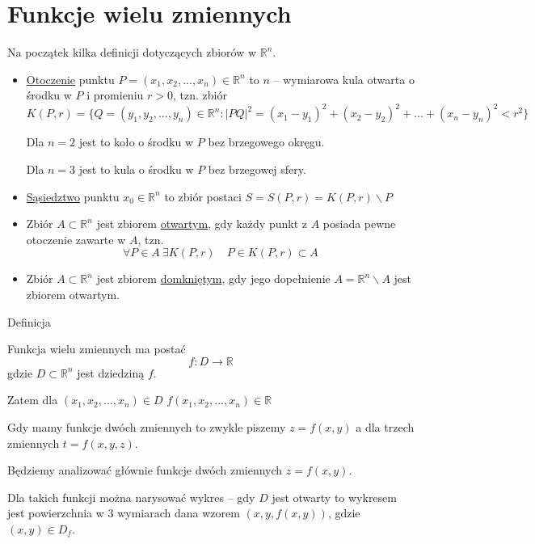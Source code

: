 \section{Funkcje wielu zmiennych}

Na początek kilka definicji dotyczących zbiorów w $ \mathbb{R}^n $.

\begin{itemize}
    \item \underline{Otoczenie} punktu $ P = (x_1, x_2, ..., x_n) \in \mathbb{R}^n $ to $n$ -- wymiarowa kula otwarta o środku
    w $P$ i promieniu $r > 0$, tzn. zbiór
    \[ K(P, r) = \{ Q = (y_1, y_2, ..., y_n) \in \mathbb{R}^n : |PQ|^2 = (x_1 - y_1)^2 + (x_2 - y_2)^2 + ... + (x_n - y_n)^2 < r^2 \} \]

    Dla $n=2$ jest to koło o środku w $P$ bez brzegowego okręgu.

    Dla $n=3$ jest to kula o środku w $P$ bez brzegowej sfery.
    \item \underline{Sąsiedztwo} punktu $x_0 \in \mathbb{R}^n$ to zbiór postaci $ S = S(P, r) = K(P,r) \backslash P $
    \item Zbiór $ A \subset \mathbb{R}^n $ jest zbiorem \underline{otwartym}, gdy każdy punkt z $A$ posiada pewne otoczenie zawarte w $A$, tzn.
    \[ \forall P \!\in\! A \ \exists K(P, r) \quad P\in K(P,r) \subset A \]
    \item Zbiór $ A \subset \mathbb{R}^n $ jest zbiorem \underline{domkniętym}, gdy jego dopełnienie $ A = \mathbb{R}^n \backslash A $ jest zbiorem otwartym. \bigskip
\end{itemize}

\begin{tw}{Definicja}

Funkcja wielu zmiennych ma postać
$$ f: D \to \mathbb{R} $$
gdzie $ D \subset \mathbb{R}^n $ jest dziedziną $f$.

Zatem dla $ (x_1, x_2, ..., x_n) \in D $ \quad $ f(x_1, x_2, ..., x_n) \in \mathbb{R} $
\end{tw}

Gdy mamy funkcje dwóch zmiennych to zwykle piszemy $ z = f(x, y) $ a dla trzech zmiennych $ t = f(x, y, z) $.

Będziemy analizować głównie funkcje dwóch zmiennych $ z = f(x, y) $.

Dla takich funkcji można narysować wykres -- gdy $D$ jest otwarty to wykresem jest powierzchnia w $3$ wymiarach dana wzorem
$ (x, y, f(x,y)) $, gdzie $ (x,y) \in D_f $.


